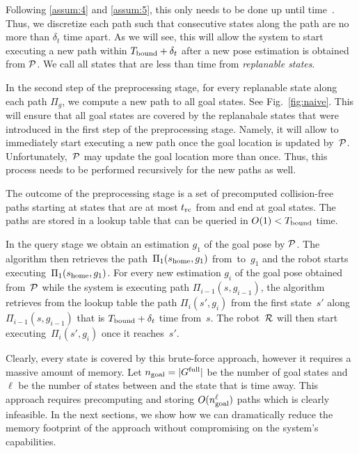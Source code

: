 \documentclass[a4paper,10pt]{article}
\begin{document}
%
Following \ref{assum:4} and \ref{assum:5}, this only needs to be done up until time~\Trc.
Thus, we discretize each path such that consecutive states along the path are no more than $\delta _t$ time apart. As we will see, this will allow the system to start executing a new path within $T_{\textrm{bound}} + \delta_t$ after a new pose estimation is obtained from $\mathcal{P}$.
%
We call all states that are less than \Trc time from \Shome \emph{replanable states}.


In the second step of the preprocessing stage, for every replanable state along each path $\Pi_g$, we compute a new path to all goal states. 
See Fig.~\ref{fig:naive}.
%
This will ensure that all goal states are covered by the replanabale states that were introduced in the first step of the preprocessing stage. Namely, it will allow to immediately start executing a new path once the goal location is updated by~$\mathcal{P}$.
%
Unfortunately,~$\mathcal{P}$ may update the goal location more than once. Thus, this process needs to be performed recursively for the new paths as well.


The outcome of the preprocessing stage is a set of precomputed collision-free paths starting at states that are at most $t_{\textrm{rc}}$ from \Shome and end at goal states.
The paths are stored in a lookup table that can be queried in $O(1) < T_{\textrm{bound}}$ time.

In the query stage we obtain an estimation $g_1$ of the goal pose by $\mathcal{P}$. 
The algorithm then retrieves the path~$\Pi_1(s_{\textrm{home}},g_1)$ from~\Shome to~$g_1$ and the robot starts executing~$\Pi_1(s_{\textrm{home}},g_1)$.
%
For every new estimation $g_i$ of the goal pose obtained from~$\mathcal{P}$  while the system is executing path $\Pi_{i-1}(s,g_{i-1})$, the algorithm retrieves from the lookup table the path $\Pi_i(s',g_i)$ from the first state~$s'$ along $\Pi_{i-1}(s,g_{i-1})$ that is $T_{\textrm{bound}} + \delta_t$ time from~$s$. The robot~$\mathcal{R}$ will then start executing~$\Pi_i(s',g_i)$ once it reaches~$s'$.

Clearly, every state is covered by this brute-force approach, however it requires a massive amount of memory.
Let $n_{\rm goal} = \vert G^{\textrm{full}} \vert$ be the number of goal states and
$\ell$ be the number of states between \Shome and the state that is \Trc time away.
This approach requires precomputing and storing $O(n_{\rm goal}^\ell)$ paths which is clearly infeasible.
In the next sections, we show how we can dramatically reduce the memory footprint of the approach without compromising on the system's capabilities.
\end{document}
